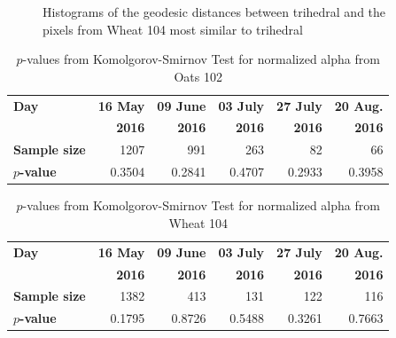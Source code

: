 \documentclass[journal]{IEEEtran}
\begin{document}
\begin{figure}[hbt]
\centering
{}
\caption{Histograms of the geodesic distances between trihedral and the pixels from Wheat 104 most similar to trihedral}
\label{fig:histograms_alpha_wt104}
\end{figure}

\begin{table}[hbt]
  \centering
  \caption{$p$-values from Komolgorov-Smirnov Test for normalized alpha from Oats 102}
  \label{tab:pvalues_alpha_ot102}
  \begin{tabular}{lrrrrr}
    \toprule
    \textbf{Day} & \textbf{16 May} & \textbf{09 June} & \textbf{03 July} & \textbf{27 July} & \textbf{20 Aug.}\\ 
                 & \textbf{2016} & \textbf{2016} & \textbf{2016} & \textbf{2016} & \textbf{2016}\\\midrule
    \textbf{Sample size} & 1207 & 991 & 263 & 82 & 66\\
    \textbf{$p$-value} & 0.3504 & 0.2841 & 0.4707 & 0.2933 & 0.3958\\
    \bottomrule
  \end{tabular}
\end{table}

\begin{table}[hbt]
  \centering
  \caption{$p$-values from Komolgorov-Smirnov Test for normalized alpha from Wheat 104}
  \label{tab:pvalues_alpha_wt104}
  \begin{tabular}{lrrrrr}
    \toprule
    \textbf{Day} & \textbf{16 May} & \textbf{09 June} & \textbf{03 July} & \textbf{27 July} & \textbf{20 Aug.}\\ 
                 & \textbf{2016} & \textbf{2016} & \textbf{2016} & \textbf{2016} & \textbf{2016}\\\midrule
    \textbf{Sample size} & 1382 & 413 & 131 & 122 & 116\\
    \textbf{$p$-value} & 0.1795 & 0.8726 & 0.5488 & 0.3261 & 0.7663\\
    \bottomrule
  \end{tabular}
\end{table}
\end{document}
